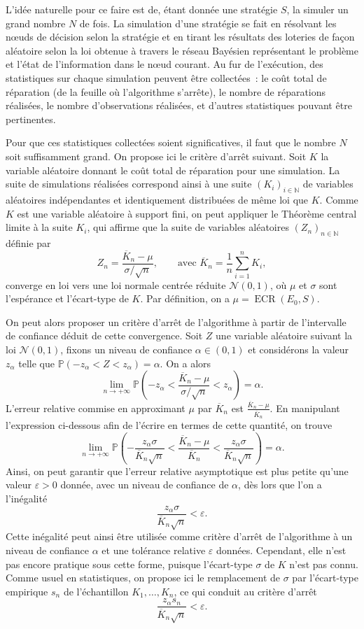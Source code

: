 \documentclass[a4paper,11pt]{article}
\theoremstyle{plain}
\theoremstyle{definition}
\DeclareMathOperator{\ECR}{ECR}
\begin{document}
L'idée naturelle pour ce faire est de, étant donnée une stratégie $S$, la simuler un grand nombre $N$ de fois. La simulation d'une stratégie se fait en résolvant les nœuds de décision selon la stratégie et en tirant les résultats des loteries de façon aléatoire selon la loi obtenue à travers le réseau Bayésien représentant le problème et l'état de l'information dans le nœud courant. Au fur de l'exécution, des statistiques sur chaque simulation peuvent être collectées~: le coût total de réparation (de la feuille où l'algorithme s'arrête), le nombre de réparations réalisées, le nombre d'observations réalisées, et d'autres statistiques pouvant être pertinentes.

Pour que ces statistiques collectées soient significatives, il faut que le nombre $N$ soit suffisamment grand. On propose ici le critère d'arrêt suivant. Soit $K$ la variable aléatoire donnant le coût total de réparation pour une simulation. La suite de simulations réalisées correspond ainsi à une suite $(K_i)_{i \in \mathbb N}$ de variables aléatoires indépendantes et identiquement distribuées de même loi que $K$. Comme $K$ est une variable aléatoire à support fini, on peut appliquer le Théorème central limite à la suite $K_i$, qui affirme que la suite de variables aléatoires $(Z_n)_{n \in \mathbb N}$ définie par
\[
Z_n = \frac{\overline K_n - \mu}{\sigma / \sqrt{n}}, \qquad \text{avec } \overline K_n = \frac{1}{n} \sum_{i=1}^n K_i,
\]
converge en loi vers une loi normale centrée réduite $\mathcal N(0, 1)$, où $\mu$ et $\sigma$ sont l'espérance et l'écart-type de $K$. Par définition, on a $\mu = \ECR(E_0, S)$.

On peut alors proposer un critère d'arrêt de l'algorithme à partir de l'intervalle de confiance déduit de cette convergence. Soit $Z$ une variable aléatoire suivant la loi $\mathcal N(0, 1)$, fixons un niveau de confiance $\alpha \in (0, 1)$ et considérons la valeur $z_\alpha$ telle que $\mathbb P(-z_\alpha < Z < z_\alpha) = \alpha$. On a alors
\[
\lim_{n \to +\infty} \mathbb P\left(-z_\alpha < \frac{\overline K_n - \mu}{\sigma / \sqrt{n}} < z_\alpha\right) = \alpha.
\]
L'erreur relative commise en approximant $\mu$ par $\overline K_n$ est $\frac{\overline K_n - \mu}{\overline K_n}$. En manipulant l'expression ci-dessous afin de l'écrire en termes de cette quantité, on trouve
\[
\lim_{n \to +\infty} \mathbb P\left(-\frac{z_\alpha \sigma}{\overline K_n \sqrt{n}} < \frac{\overline K_n - \mu}{\overline K_n} < \frac{z_\alpha \sigma}{\overline K_n \sqrt{n}}\right) = \alpha.
\]
Ainsi, on peut garantir que l'erreur relative asymptotique est plus petite qu'une valeur $\varepsilon > 0$ donnée, avec un niveau de confiance de $\alpha$, dès lors que l'on a l'inégalité
\[
\frac{z_\alpha \sigma}{\overline K_n \sqrt{n}} < \varepsilon.
\]
Cette inégalité peut ainsi être utilisée comme critère d'arrêt de l'algorithme à un niveau de confiance $\alpha$ et une tolérance relative $\varepsilon$ données. Cependant, elle n'est pas encore pratique sous cette forme, puisque l'écart-type $\sigma$ de $K$ n'est pas connu. Comme usuel en statistiques, on propose ici le remplacement de $\sigma$ par l'écart-type empirique $s_n$ de l'échantillon $K_1, \dotsc, K_n$, ce qui conduit au critère d'arrêt
\[
\frac{z_\alpha s_n}{\overline K_n \sqrt{n}} < \varepsilon.
\]
\end{document}
